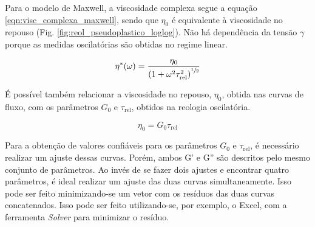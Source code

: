 			Para o modelo de Maxwell, a viscosidade complexa segue a equação \ref{eqn:visc_complexa_maxwell}, sendo que \(\eta_0\) é equivalente à viscosidade no repouso (Fig. \ref{fig:reol_pseudoplastico_loglog}). Não há dependência da tensão \(\gamma\) porque as medidas oscilatórias são obtidas no regime linear. %
			
			\begin{equation}
				 \eta^* (\omega) = \dfrac{\eta_0}{\left( 1 + \omega^2 \tau_\mathrm{rel}^2 \right)^{\sfrac{1}{2}}}
				\label{eqn:visc_complexa_maxwell}
			\end{equation}
			
			É possível também relacionar a viscosidade no repouso, \(\eta_0\), obtida nas curvas de fluxo, com os parâmetros \(G_0\) e \(\tau_{\mathrm{rel}}\), obtidos na reologia oscilatória.
			
			\begin{equation}
				\eta_0 = G_0 \tau_{\mathrm{rel}}
				\label{eqn:eta0_g0_taurel}
			\end{equation}  %
			
			
			Para a obtenção de valores confiáveis para os parâmetros \(G_0\) e \(\tau_{\mathrm{rel}}\), é necessário realizar um ajuste dessas curvas. Porém, ambos G' e G'' são descritos pelo mesmo conjunto de parâmetros. Ao invés de se fazer dois ajustes e encontrar quatro parâmetros, é ideal realizar um ajuste das duas curvas simultaneamente. Isso pode ser feito minimizando-se um vetor com os resíduos das duas curvas concatenados. Isso pode ser feito utilizando-se, por exemplo, o Excel, com a ferramenta \emph{Solver} para minimizar o resíduo.
			
			
			
